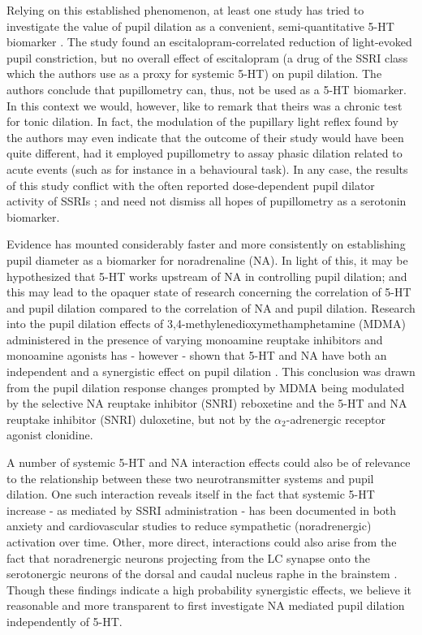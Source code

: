 	Relying on this established phenomenon, at least one study has tried to investigate the value of pupil dilation as a convenient, semi-quantitative 5-HT biomarker \citep{Noehr-Jensen2009}.
	The study found an escitalopram-correlated reduction of light-evoked pupil constriction, but no overall effect of escitalopram (a drug of the SSRI class which the authors use as a proxy for systemic 5-HT) on pupil dilation.
	The authors conclude that pupillometry can, thus, not be used as a 5-HT biomarker.
	In this context we would, however, like to remark that theirs was a chronic test for tonic dilation.
	In fact, the modulation of the pupillary light reflex found by the authors may even indicate that the outcome of their study would have been quite different, had it employed pupillometry to assay phasic dilation related to acute events (such as for instance in a behavioural task).
	In any case, the results of this study conflict with the often reported dose-dependent pupil dilator activity of SSRIs \citep{Nielsen2010,Fitzgerald2013,Klein-Schwartz2012};
	and need not dismiss all hopes of pupillometry as a serotonin biomarker.
	
	Evidence has mounted considerably faster and more consistently on establishing pupil diameter as a biomarker for noradrenaline (NA).
	In light of this, it may be hypothesized that 5-HT works upstream of NA in controlling pupil dilation; and this may lead to the opaquer state of research concerning the correlation of 5-HT and pupil dilation compared to the correlation of NA and pupil dilation.
	Research into the pupil dilation effects of 3,4-methylenedioxymethamphetamine (MDMA) administered in the presence of varying monoamine reuptake inhibitors and monoamine agonists has - however - shown that 5-HT and NA have both an independent and a synergistic effect on pupil dilation \citep{Hysek2012}.
	This conclusion was drawn from the pupil dilation response changes prompted by MDMA being modulated by the selective NA reuptake inhibitor (SNRI) reboxetine and the 5-HT and NA reuptake inhibitor (SNRI) duloxetine, but not by the $\alpha_2$-adrenergic receptor agonist clonidine.
	
	A number of systemic 5-HT and NA interaction effects could also be of relevance to the relationship between these two neurotransmitter systems and pupil dilation.
	One such interaction reveals itself in the fact that systemic 5-HT increase - as mediated by SSRI administration - has been documented in both anxiety \citep{Blier2007} and cardiovascular \citep{Barton2007} studies to reduce sympathetic (noradrenergic) activation over time.
	Other, more direct, interactions could also arise from the fact that noradrenergic neurons projecting from the LC synapse onto the serotonergic neurons of the dorsal and caudal nucleus raphe in the brainstem \citep{Samuels2008}.
	Though these findings indicate a high probability synergistic effects, we believe it reasonable and more transparent to first investigate NA mediated pupil dilation independently of 5-HT.
	
